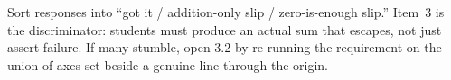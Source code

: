 \documentclass[10pt]{article}
\begin{document}
\begin{teachernote}
Sort responses into ``got it / addition-only slip / zero-is-enough slip.'' Item~3 is the discriminator:
students must produce an actual sum that escapes, not just assert failure. If many stumble, open 3.2
by re-running the requirement on the union-of-axes set beside a genuine line through the origin.
\end{teachernote}
\end{document}
